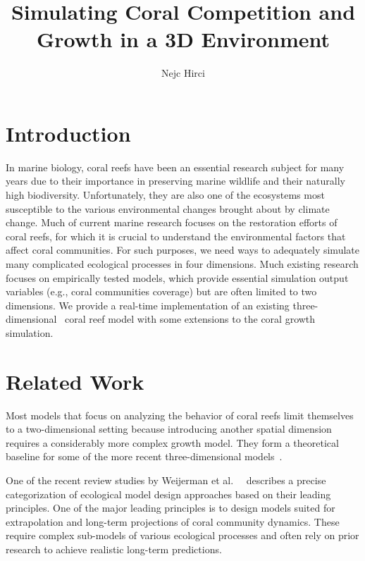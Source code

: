\documentclass[9pt]{pnas-new}
\title{Simulating Coral Competition and Growth in a 3D Environment}
\author{Nejc Hirci}
\affil{Collective behavior course research seminar report}
\renewcommand{\etal}{et al.\ }
\newcommand{\eg}{e.g., }
\begin{document}
\verticaladjustment{-2pt}

\maketitle
\thispagestyle{firststyle}

\section*{Introduction}

In marine biology, coral reefs have been an essential research subject for many years due to their importance in preserving marine wildlife and their naturally high biodiversity. Unfortunately, they are also one of the ecosystems most susceptible to the various environmental changes brought about by climate change. Much of current marine research focuses on the restoration efforts of coral reefs, for which it is crucial to understand the environmental factors that affect coral communities. For such purposes, we need ways to adequately simulate many complicated ecological processes in four dimensions. Much existing research focuses on empirically tested models, which provide essential simulation output variables (\eg coral communities coverage) but are often limited to two dimensions. We provide a real-time implementation of an existing three-dimensional~\cite{coral_community_3D} coral reef model with some extensions to the coral growth simulation.

\section*{Related Work}

Most models that focus on analyzing the behavior of coral reefs limit themselves to a two-dimensional setting because introducing another spatial dimension requires a considerably more complex growth model. They form a theoretical baseline for some of the more recent three-dimensional models~\cite{coral_community_3D}.

One of the recent review studies by Weijerman \etal~\cite{coral_models_review} describes a precise categorization of ecological model design approaches based on their leading principles. One of the major leading principles is to design models suited for extrapolation and long-term projections of coral community dynamics. These require complex sub-models of various ecological processes and often rely on prior research to achieve realistic long-term predictions.
\end{document}
